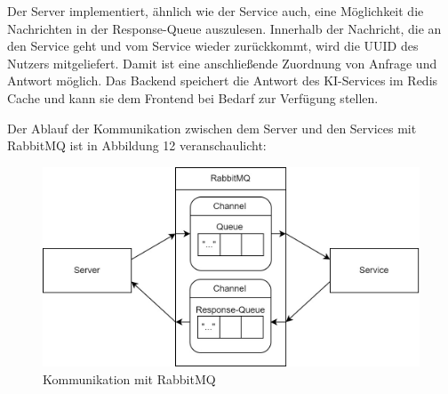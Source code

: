 Der Server implementiert, ähnlich wie der Service auch, eine Möglichkeit die Nachrichten in der Response-Queue auszulesen. Innerhalb der Nachricht, die an den Service geht und vom Service wieder zurückkommt, wird die UUID des Nutzers mitgeliefert. Damit ist eine anschließende Zuordnung von Anfrage und Antwort möglich. Das Backend speichert die Antwort des KI-Services im Redis Cache und kann sie dem Frontend bei Bedarf zur Verfügung stellen.

Der Ablauf der Kommunikation zwischen dem Server und den Services mit RabbitMQ ist in Abbildung 12 veranschaulicht: 
\begin{figure}[H]
  \centering
    \includegraphics[width = 15cm]{bilder/Rabbit3}
    \caption{Kommunikation mit RabbitMQ}
\end{figure}

